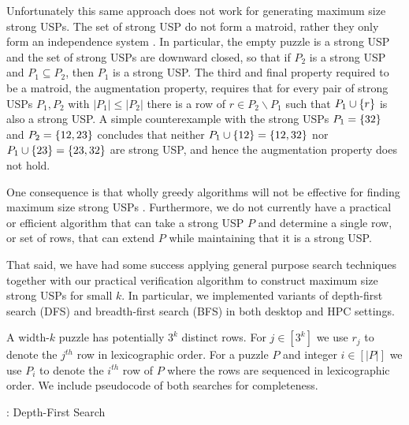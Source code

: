 \documentclass[11pt]{article}
\begin{document}
Unfortunately this same approach does not work for generating maximum
size strong USPs.  The set of strong USP do not form a matroid, rather
they only form an independence system \cite{XXX}.  In particular, the
empty puzzle is a strong USP and the set of strong USPs are downward
closed, so that if $P_2$ is a strong USP and $P_1 \subseteq P_2$, then
$P_1$ is a strong USP.  The third and final property required to be a
matroid, the augmentation property, requires that for every pair of
strong USPs $P_1, P_2$ with $|P_1| \le |P_2|$ there is a row of $r \in
P_2 \backslash P_1$ such that $P_1 \cup \left\{ r \right\}$ is also a strong USP.
A simple counterexample with the strong USPs $P_1 = \left\{ 32 \right\}$ and $P_2
= \left\{ 12, 23 \right\}$ concludes that neither $P_1 \cup \left\{ 12 \right\} = \left\{ 12,
  32 \right\}$ nor $P_1 \cup \left\{ 23 \right\} = \left\{ 23, 32 \right\}$ are strong USP, and
hence the augmentation property does not hold.

One consequence is that wholly greedy algorithms will not be effective
for finding maximum size strong USPs \cite{XXX}.  Furthermore, we do not
currently have a practical or efficient algorithm that can take a
strong USP $P$ and determine a single row, or set of rows, that can
extend $P$ while maintaining that it is a strong USP.

That said, we have had some success applying general purpose search
techniques together with our practical verification algorithm to
construct maximum size strong USPs for small $k$.  In particular, we
implemented variants of depth-first search (DFS) and breadth-first
search (BFS) in both desktop and HPC settings.  

A width-$k$ puzzle has potentially $3^k$ distinct rows.  For $j \in
[3^k]$ we use $r_j$ to denote the $j^{th}$ row in lexicographic order.
For a puzzle $P$ and integer $i \in [|P|]$ we use $P_i$ to denote the
$i^{th}$ row of $P$ where the rows are sequenced in lexicographic
order. We include pseudocode of both searches for completeness.

\begin{algorithm}
  \caption{: Depth-First Search}
  \label{alg:2dm}
\begin{algorithmic}[1]
  
  
  
    \EndIf
  \EndFor
  
  
  \EndFunction
\end{algorithmic}
\end{algorithm}
\end{document}
